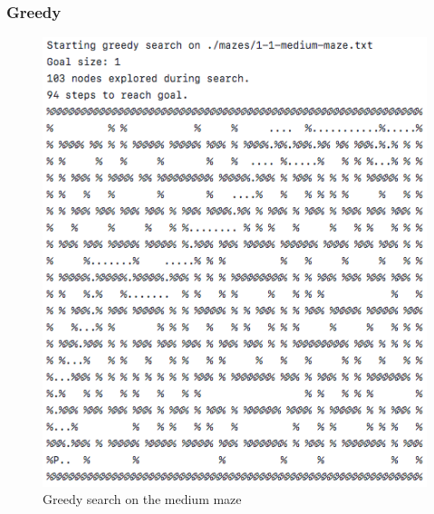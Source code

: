 \documentclass[titlepage]{article}
\begin{document}
\subsubsection*{Greedy}
\begin{figure}[h!]
\includegraphics[width=\linewidth]{greedymedium.png}
\caption{Greedy search on the medium maze}
\label{fig:greedymedium}
\end{figure}

\newpage
\end{document}
